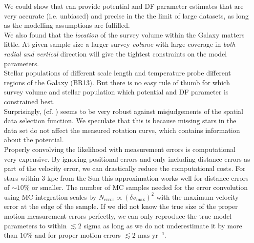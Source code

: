  We could show that \RM{} can provide potential and DF parameter estimates that are very accurate (i.e. unbiased) and precise in the the limit of large datasets, as long as the modelling assumptions are fulfilled.
\\We also found that the \emph{location} of the survey volume within the Galaxy matters little. At given sample size a larger survey \emph{volume} with large coverage in \emph{both radial and vertical} direction will give the tightest constraints on the model parameters.
\\Stellar populations of different scale length and temperature probe different regions of the Galaxy (BR13). But there is no easy rule of thumb for which survey volume and stellar population which potential and DF parameter is constrained best.
\\Surprisingly, (cf. \citealt{2013A&ARv..21...61R}) \RM{} seems to be very robust against misjudgements of the spatial data selection function. We speculate that this is because missing stars in the data set do not affect the measured rotation curve, which contains information about the potential.
\\  Properly convolving the likelihood with measurement errors is computational very expensive. By ignoring positional errors and only including distance errors as part of the velocity error, we can drastically reduce the computational costs. For stars within 3 kpc from the Sun this approximation works well for distance errors of $\sim 10\%$ or smaller. The number of MC samples needed for the error convolution using MC integration scales by $N_\text{error} \propto (\delta v_\text{max})^2$ with the maximum velocity error at the edge of the sample. If we did not know the true size of the proper motion measurement errors perfectly, we can only reproduce the true model parameters to within $\lesssim 2$ sigma \Wilma{[TO DO: Check???]} as long as we do not underestimate it by more than $10\%$ and for proper motion errors $\lesssim 2 \text{ mas yr}^{-1}$.\\

